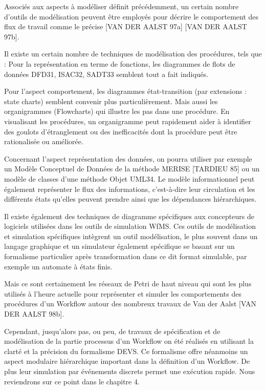 Associés aux aspects à modéliser définit précédemment, un certain nombre d’outils de modélisation peuvent être employés pour décrire le comportement des flux de travail comme le précise [VAN DER AALST 97a] [VAN DER AALST 97b].

Il existe un certain nombre de techniques de modélisation des procédures, tels que : Pour la représentation en terme de fonctions, les diagrammes de flots de données DFD31, ISAC32, SADT33 semblent tout a fait indiqués.  


Pour l’aspect comportement, les diagrammes état-transition (par extensions : state charts) semblent convenir plus particulièrement. Mais aussi les organigrammes (Flowcharts) qui illustre les pas dans une procédure. En visualisant les procédures, un organigramme peut rapidement aider à identifier des goulots d'étranglement ou des inefficacités dont la procédure peut être rationalisée ou améliorée. 

Concernant l’aspect représentation des données, on pourra utiliser par exemple un Modèle Conceptuel de Données de la méthode MERISE [TARDIEU 85] ou un modèle de classes d’une méthode Objet UML34. Le modèle informationnel peut également représenter le flux des informations, c’est-à-dire leur circulation et les différents états qu’elles peuvent prendre ainsi que les dépendances hiérarchiques.

Il existe également des techniques de diagramme spécifiques aux concepteurs de logiciels utilisées dans les outils de simulation WfMS. Ces outils de modélisation et simulation spécifiques intègrent un outil modélisation, le plus souvent dans un langage graphique et un simulateur également spécifique se basant sur un formalisme particulier après transformation dans ce dit format simulable, par exemple un automate à états finis. 


Mais ce sont certainement les réseaux de Petri de haut niveau qui sont les plus utilisés à l’heure actuelle pour représenter et simuler les comportements des procédures d’un Workflow autour des nombreux travaux de Van der Aalst [VAN DER AALST 98b]. 

Cependant, jusqu’alors pas, ou peu, de travaux de spécification et de modélisation de la partie processus d’un Workflow on été réalisés en utilisant la clarté et la précision du formalisme DEVS. Ce formalisme offre néanmoins un aspect modulaire hiérarchique important dans la définition d’un Workflow. De plus leur simulation par événements discrets permet une exécution rapide. Nous reviendrons sur ce point dans le chapitre 4. 

